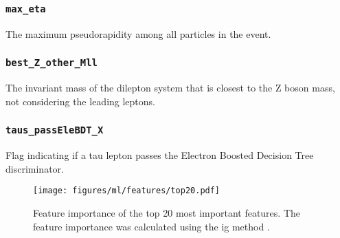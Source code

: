 \subsubsection{\texttt{max\_eta}} The maximum pseudorapidity among all particles in the event.

\subsubsection{\texttt{best\_Z\_other\_Mll}} The invariant mass of the dilepton system that is closest to the Z boson mass,
not considering the leading leptons.

\subsubsection{\texttt{taus\_passEleBDT\_X}} Flag indicating if a tau lepton passes the Electron Boosted Decision Tree
discriminator.

\begin{figure}[hbtp]
    \centering
    \texttt{[image: figures/ml/features/top20.pdf]}
    \caption{Feature importance of the top 20 most important features. The feature importance was calculated using the
        \gls{ig} method \cite{ig}.}
    \label{fig:feature_importance}
\end{figure}

\clearpage